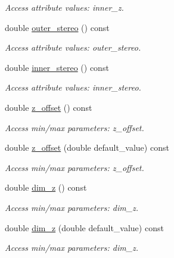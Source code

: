 \begin{DoxyCompactItemize}
\begin{DoxyCompactList}\small\item\em Access attribute values\+: inner\+\_\+z. \end{DoxyCompactList}\item 
double \hyperlink{struct_d_d4hep_1_1_x_m_l_1_1_dimension_a6b339b15ea072e7d0b1897345432560a}{outer\+\_\+stereo} () const
\begin{DoxyCompactList}\small\item\em Access attribute values\+: outer\+\_\+stereo. \end{DoxyCompactList}\item 
double \hyperlink{struct_d_d4hep_1_1_x_m_l_1_1_dimension_acd6f47f589b45b86da5407f1973cca82}{inner\+\_\+stereo} () const
\begin{DoxyCompactList}\small\item\em Access attribute values\+: inner\+\_\+stereo. \end{DoxyCompactList}\item 
double \hyperlink{struct_d_d4hep_1_1_x_m_l_1_1_dimension_a3630a487dbfca8d230026cf39a2d5348}{z\+\_\+offset} () const
\begin{DoxyCompactList}\small\item\em Access min/max parameters\+: z\+\_\+offset. \end{DoxyCompactList}\item 
double \hyperlink{struct_d_d4hep_1_1_x_m_l_1_1_dimension_a193d27d00aaf58815c1d7331dc0248e0}{z\+\_\+offset} (double default\+\_\+value) const
\begin{DoxyCompactList}\small\item\em Access min/max parameters\+: z\+\_\+offset. \end{DoxyCompactList}\item 
double \hyperlink{struct_d_d4hep_1_1_x_m_l_1_1_dimension_a4cba6e963013ca4c4f2fd6b4218e9a6f}{dim\+\_\+z} () const
\begin{DoxyCompactList}\small\item\em Access min/max parameters\+: dim\+\_\+z. \end{DoxyCompactList}\item 
double \hyperlink{struct_d_d4hep_1_1_x_m_l_1_1_dimension_a3a76f6f77e342146e9cc3548325355fa}{dim\+\_\+z} (double default\+\_\+value) const
\begin{DoxyCompactList}\small\item\em Access min/max parameters\+: dim\+\_\+z. \end{DoxyCompactList}\item 

\end{DoxyCompactItemize}
